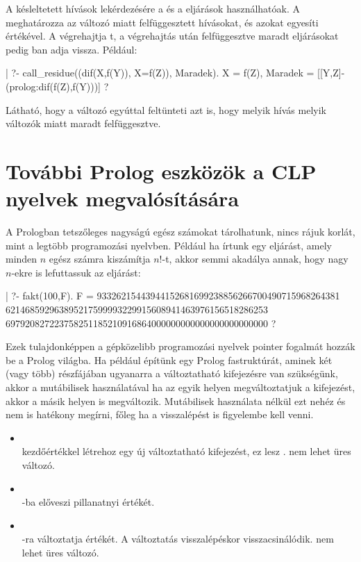 A késleltetett hívások lekérdezésére a  és a 
eljárások használhatóak. A  meghatározza az 
változó miatt felfüggesztett hívásokat, és azokat egyesíti 
értékével. A  végrehajtja t, a
végrehajtás után felfüggesztve maradt eljárásokat pedig ban adja
vissza. Például:

\begin{prologcode}
| ?- call_residue((dif(X,f(Y)), X=f(Z)), Maradek).
X = f(Z),
Maradek = [[Y,Z]-(prolog:dif(f(Z),f(Y)))] ?
\end{prologcode}

Látható, hogy a  változó egyúttal feltünteti azt is, hogy melyik
hívás melyik változók miatt maradt felfüggesztve.

\section{További Prolog eszközök a CLP nyelvek megvalósítására}

A Prologban tetszőleges nagyságú egész számokat tárolhatunk, nincs rájuk
korlát, mint a legtöbb programozási nyelvben. Például ha írtunk egy
 eljárást, amely minden $n$ egész számra kiszámítja $n!$-t, akkor
semmi akadálya annak, hogy nagy $n$-ekre is lefuttassuk az eljárást:

\begin{prologcode}
| ?- fakt(100,F).
F = 93326215443944152681699238856266700490715968264381
621468592963895217599993229915608941463976156518286253
697920827223758251185210916864000000000000000000000000 ? 
\end{prologcode}


Ezek tulajdonképpen a gépközelibb programozási nyelvek pointer
fogalmát hozzák be a Prolog világba. Ha például építünk egy
Prolog fastruktúrát, aminek két (vagy több) részfájában
ugyanarra a változtatható kifejezésre van szükségünk, akkor a
mutábilisek használatával ha az egyik helyen megváltoztatjuk a
kifejezést, akkor a másik helyen is megváltozik. Mutábilisek
használata nélkül ezt nehéz és nem is hatékony megírni, főleg
ha a visszalépést is figyelembe kell venni.

\begin{itemize}
\item {} \\
 kezdőértékkel létrehoz egy új változtatható kifejezést,
ez lesz .  nem lehet üres változó.

\item {} \\
-ba előveszi  pillanatnyi értékét.

\item {} \\
-ra változtatja  értékét. A változtatás visszalépéskor
visszacsinálódik.  nem lehet üres változó.
\end{itemize}

